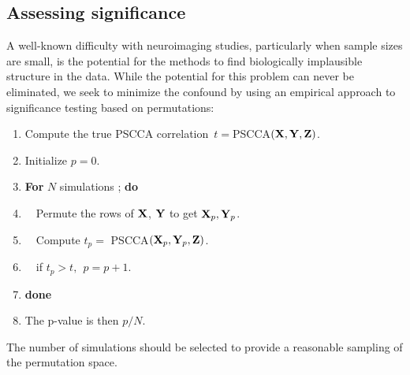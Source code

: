 \documentclass{llncs}
\newcommand{\X}{{\bf X}}
\newcommand{\x}{{\bf x}}
\newcommand{\Y}{{\bf Y}}
\newcommand{\y}{{\bf y}}
\newcommand{\Z}{{\bf Z}}
\begin{document}
 
\subsection{Assessing significance}
A well-known difficulty with neuroimaging studies, particularly when
sample sizes are small, is the potential for the methods to find biologically implausible structure in the data.  While the
potential for this problem can never be eliminated, we seek to
minimize the confound by using an empirical approach to significance
testing based on permutations:
\begin{enumerate}
\item Compute the true PSCCA correlation~$t=$PSCCA$(\X,\Y,\Z)$.  
\item Initialize $p=0$. 
\item {\bf For} $N$ simulations ; {\bf do }
\item ~~Permute the rows of $\X$, $\Y$ to get $\X_p, \Y_p$.
\item ~~Compute $t_p=$ PSCCA$(\X_p,\Y_p,\Z)$.
\item ~~if $t_p > t , ~~p=p+1$.
\item {\bf done }
\item The p-value is then $p/N$. 
\end{enumerate}
The number of simulations should be selected to provide a reasonable
sampling of the permutation space.  
\end{document}

